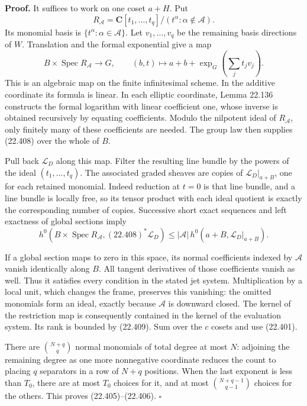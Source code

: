 \documentclass[
  11pt,
  a4paper,
]{article}
\begin{document}
\textbf{Proof.} It suffices to work on one coset \(a+H\). Put \[
 R_{\mathcal A}=\mathbf C[t_1,\ldots,t_q]/
       (t^\alpha:\alpha\notin\mathcal A).
 \tag{22.407}
\] Its monomial basis is \(\{t^\alpha:\alpha\in\mathcal A\}\). Let
\(v_1,\ldots,v_q\) be the remaining basis directions of \(W\).
Translation and the formal exponential give a map \[
 B\times\operatorname{Spec}R_{\mathcal A}\longrightarrow G,
 \qquad (b,t)\longmapsto a+b+\exp_G\left(\sum_jt_jv_j\right).
 \tag{22.408}
\] This is an algebraic map on the finite infinitesimal scheme. In the
additive coordinate its formula is linear. In each elliptic coordinate,
Lemma 22.136 constructs the formal logarithm with linear coefficient
one, whose inverse is obtained recursively by equating coefficients.
Modulo the nilpotent ideal of \(R_{\mathcal A}\), only finitely many of
these coefficients are needed. The group law then supplies (22.408) over
the whole of \(B\).

Pull back \(\mathcal L_D\) along this map. Filter the resulting line
bundle by the powers of the ideal \((t_1,\ldots,t_q)\). The associated
graded sheaves are copies of \(\mathcal L_D|_{a+B}\), one for each
retained monomial. Indeed reduction at \(t=0\) is that line bundle, and
a line bundle is locally free, so its tensor product with each ideal
quotient is exactly the corresponding number of copies. Successive short
exact sequences and left exactness of global sections imply \[
 h^0(B\times\operatorname{Spec}R_{\mathcal A},
             (22.408)^*\mathcal L_D)
 \le |\mathcal A|\,h^0(a+B,\mathcal L_D|_{a+B}).
 \tag{22.409}
\]

If a global section maps to zero in this space, its normal coefficients
indexed by \(\mathcal A\) vanish identically along \(B\). All tangent
derivatives of those coefficients vanish as well. Thus it satisfies
every condition in the stated jet system. Multiplication by a local
unit, which changes the frame, preserves this vanishing: the omitted
monomials form an ideal, exactly because \(\mathcal A\) is downward
closed. The kernel of the restriction map is consequently contained in
the kernel of the evaluation system. Its rank is bounded by (22.409).
Sum over the \(c\) cosets and use (22.401).

There are \(\binom{N+q}{q}\) normal monomials of total degree at most
\(N\): adjoining the remaining degree as one more nonnegative coordinate
reduces the count to placing \(q\) separators in a row of \(N+q\)
positions. When the last exponent is less than \(T_0\), there are at
most \(T_0\) choices for it, and at most \(\binom{N+q-1}{q-1}\) choices
for the others. This proves (22.405)--(22.406). \(\square\)
\end{document}
